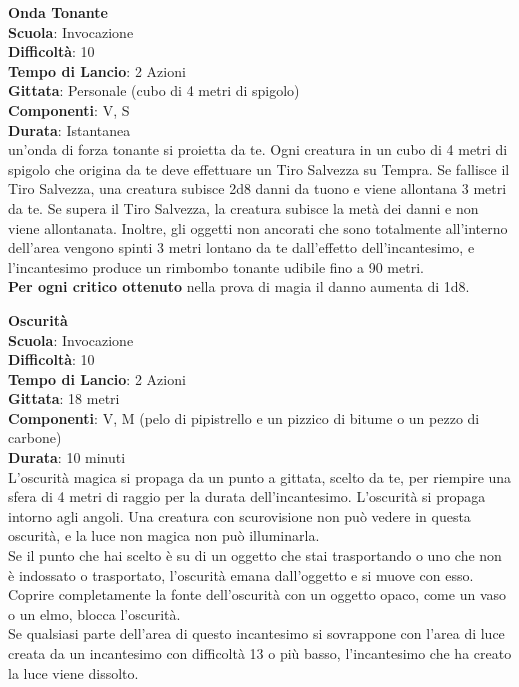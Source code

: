 \begin{multicols}{2}
\medskip\textbf{Onda Tonante}\\
\textbf{Scuola}: Invocazione\\
\textbf{Difficoltà}: 10\\
\textbf{Tempo di Lancio}: 2 Azioni\\
\textbf{Gittata}: Personale (cubo di 4 metri di spigolo)\\
\textbf{Componenti}: V, S\\
\textbf{Durata}: Istantanea\\
un'onda di forza tonante si proietta da te. Ogni creatura in un cubo di 4 metri di spigolo che origina da te deve effettuare un Tiro Salvezza su Tempra. Se fallisce il Tiro Salvezza, una creatura subisce 2d8 danni da tuono e viene allontana 3 metri da te. Se supera il Tiro Salvezza, la creatura subisce la metà dei danni e non viene allontanata. Inoltre, gli oggetti non ancorati che sono totalmente all'interno dell'area vengono spinti 3 metri lontano da te dall'effetto dell'incantesimo, e l'incantesimo produce un rimbombo tonante udibile fino a 90 metri.\\
\textbf{Per ogni critico ottenuto} nella prova di magia il danno aumenta di 1d8.

\medskip\textbf{Oscurità}\\
\textbf{Scuola}: Invocazione\\
\textbf{Difficoltà}: 10\\
\textbf{Tempo di Lancio}: 2 Azioni\\
\textbf{Gittata}: 18 metri\\
\textbf{Componenti}: V, M (pelo di pipistrello e un pizzico di bitume o un pezzo di carbone)\\
\textbf{Durata}: 10 minuti\\
L'oscurità magica si propaga da un punto a gittata, scelto da te, per riempire una sfera di 4 metri di raggio per la durata dell'incantesimo. L'oscurità si propaga intorno agli angoli. Una creatura con scurovisione non può vedere in questa oscurità, e la luce non magica non può illuminarla.\\
Se il punto che hai scelto è su di un oggetto che stai trasportando o uno che non è indossato o trasportato, l'oscurità emana dall'oggetto e si muove con esso. Coprire completamente la fonte dell'oscurità con un oggetto opaco, come un vaso o un elmo, blocca l'oscurità.\\
Se qualsiasi parte dell'area di questo incantesimo si sovrappone con l'area di luce creata da un incantesimo con difficoltà 13 o più basso, l'incantesimo che ha creato la luce viene dissolto.


\end{multicols}
